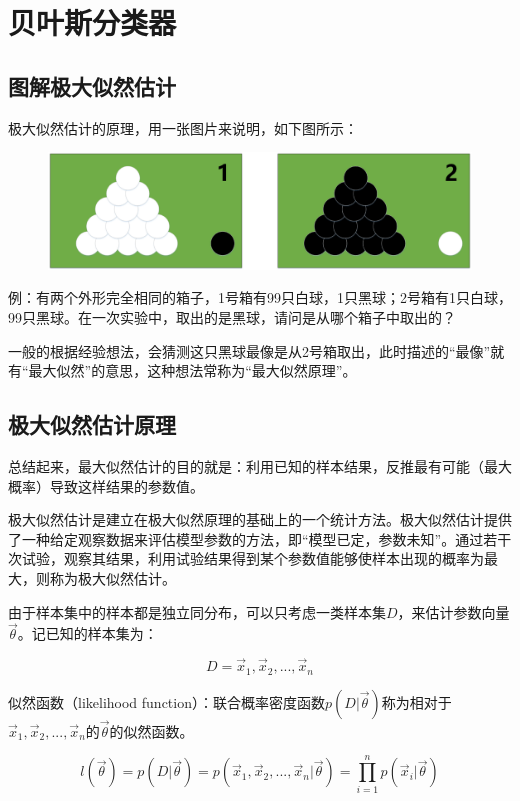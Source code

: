 \section{贝叶斯分类器}

\subsection{图解极大似然估计}

极大似然估计的原理，用一张图片来说明，如下图所示：

 \begin{figure}[h]
   \centering
   \includegraphics[width=.7\textwidth]{imgs/2.19.1.1.eps}
 \end{figure}

例：有两个外形完全相同的箱子，1号箱有99只白球，1只黑球；2号箱有1只白球，99只黑球。在一次实验中，取出的是黑球，请问是从哪个箱子中取出的？

一般的根据经验想法，会猜测这只黑球最像是从2号箱取出，此时描述的``最像''就有``最大似然''的意思，这种想法常称为``最大似然原理''。

\subsection{极大似然估计原理}

总结起来，最大似然估计的目的就是：利用已知的样本结果，反推最有可能（最大概率）导致这样结果的参数值。

极大似然估计是建立在极大似然原理的基础上的一个统计方法。极大似然估计提供了一种给定观察数据来评估模型参数的方法，即``模型已定，参数未知''。通过若干次试验，观察其结果，利用试验结果得到某个参数值能够使样本出现的概率为最大，则称为极大似然估计。

由于样本集中的样本都是独立同分布，可以只考虑一类样本集$D$，来估计参数向量$\vec\theta$。记已知的样本集为：

$$
D=\vec x_{1},\vec x_{2},...,\vec x_{n}
$$

似然函数（likelihood function）：联合概率密度函数$p(D|\vec\theta )$称为相对于$\vec x_{1},\vec x_{2},...,\vec x_{n}$的$\vec\theta$的似然函数。

$$
l(\vec\theta )=p(D|\vec\theta ) =p(\vec x_{1},\vec x_{2},...,\vec x_{n}|\vec\theta )=\prod_{i=1}^{n}p(\vec x_{i}|\vec \theta )
$$

